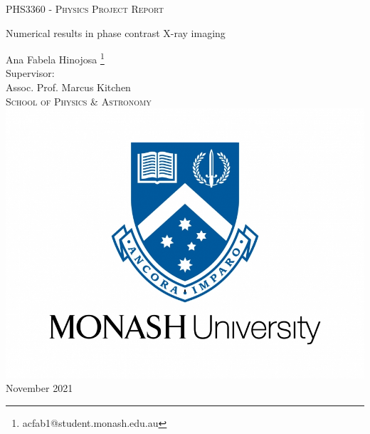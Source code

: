 \documentclass[10pt, a4paper, singlespacing]{report}
\begin{document}
\begin{titlepage}
\begin{center}

\vspace{0.5cm}
\textsc{PHS3360 - Physics Project Report} \\
\vspace{2.5cm}

{\Huge Numerical results in phase contrast X-ray imaging}
\vspace{3cm}

{\LARGE Ana Fabela Hinojosa \footnote{acfab1@student.monash.edu.au}} \\
\vspace{0.4cm}
{\Large Supervisor:\\ Assoc. Prof. Marcus Kitchen \\}
\textsc{School of Physics \& Astronomy} \\
\vspace{3cm}
\includegraphics[scale=0.2]{logo.jpg} \\ %
\vspace{3cm}
{\LARGE November 2021}\\
\vspace{0.5cm}
\end{center}
\end{titlepage}


\vspace*{0.2\textheight}
\end{document}
